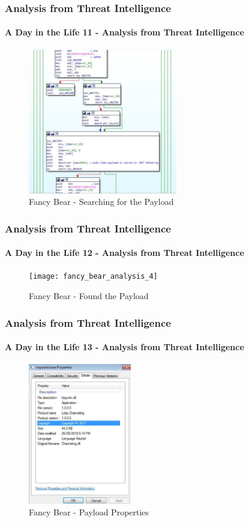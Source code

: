 \documentclass[aspectratio=169]{beamer}
\begin{document}
\begin{frame}
  \frametitle{Analysis from Threat Intelligence}
  \framesubtitle{A Day in the Life 11 - Analysis from Threat Intelligence}
  \begin{center}
    \begin{figure}
      \includegraphics[width=6.5cm,keepaspectratio]{fancy_bear_analysis_3}
      \caption{Fancy Bear - Searching for the Payload}
    \end{figure}
  \end{center}
\end{frame}

\begin{frame}
  \frametitle{Analysis from Threat Intelligence}
  \framesubtitle{A Day in the Life 12 - Analysis from Threat Intelligence}
  \begin{center}
    \begin{figure}
      \texttt{[image: fancy\_bear\_analysis\_4]}
      \caption{Fancy Bear - Found the Payload}
    \end{figure}
  \end{center}
\end{frame}

\begin{frame}
  \frametitle{Analysis from Threat Intelligence}
  \framesubtitle{A Day in the Life 13 - Analysis from Threat Intelligence}
  \begin{center}
    \begin{figure}
      \includegraphics[width=4.5cm,keepaspectratio]{fancy_bear_analysis_5}
      \caption{Fancy Bear - Payload Properties}
    \end{figure}
  \end{center}
\end{frame}
\end{document}
